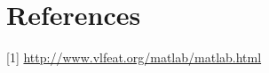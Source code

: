 \section{References}

[1] \href{http://www.vlfeat.org/matlab/matlab.html}{http://www.vlfeat.org/matlab/matlab.html}

